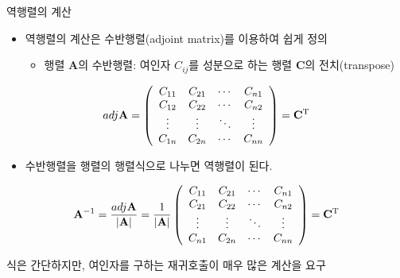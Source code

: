 \documentclass{beamer}
\begin{document}
\begin{frame}{역행렬의 계산}

\begin{itemize}
\item 역행렬의 계산은 수반행렬(adjoint matrix)를 이용하여 쉽게 정의
	\begin{itemize}
	\item 행렬 $\mathbf A$의 수반행렬: 여인자 $C_{ij}$를 성분으로 하는 행렬 $\mathbf C$의 전치(transpose)
	\end{itemize}
\end{itemize}


$$ adj \mathbf A = 
\left (
\begin{array}{cccc}
C_{11} & C_{21} & \cdots & C_{n1} \\
C_{12} & C_{22} & \cdots & C_{n2} \\
\vdots & \vdots & \ddots & \vdots \\
C_{1n} & C_{2n} & \cdots & C_{nn} \\
\end{array}
\right )
= \mathbf C^{\rm T}
$$
 
\begin{itemize}
\item 수반행렬을 행렬의 행렬식으로 나누면 역행렬이 된다.
\end{itemize}

$$\mathbf A^{-1} = \frac{adj \mathbf A}{|\mathbf A|} = 
\frac{1}{|\mathbf A|}
\left (
\begin{array}{cccc}
C_{11} & C_{21} & \cdots & C_{n1} \\
C_{21} & C_{22} & \cdots & C_{n2} \\
\vdots & \vdots & \ddots & \vdots \\
C_{n1} & C_{2n} & \cdots & C_{nn} \\
\end{array}
\right )
= \mathbf C^{\rm T}
$$

식은 간단하지만, 여인자를 구하는 재귀호출이 매우 많은 계산을 요구

\end{frame}
\end{document}
